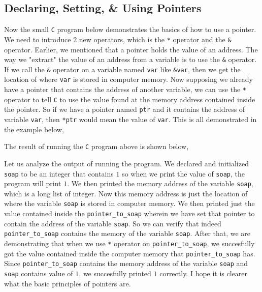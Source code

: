 \documentclass[a4paper, 12pt]{report}
\begin{document}
\begin{center}
\subsection{Declaring, Setting, \& Using Pointers}
\begin{comment}
\end{comment}
Now the small \texttt{C} program below demonstrates the basics of how to use a pointer.
We need to introduce $2$ new operators, which is the \texttt{*}  operator and the \texttt{\&} operator.
Earlier, we mentioned that a pointer holds the value of an address. 
The way we "extract" the value of an address from a variable is to use the \texttt{\&} operator.
If we call the \texttt{\&} operator on a variable named \texttt{var}  like \texttt{\&var}, then we get the location of where \texttt{var} is stored in computer memory.
Now supposing we already have a pointer that contains the address of another variable, we can use the \texttt{*} operator to tell \texttt{C} to use the value found at the memory address contained inside the pointer.
So if we have a pointer named \texttt{ptr} and it contains the address of variable \texttt{var}, then \texttt{*ptr} would mean the value of \texttt{var}.
This is all demonstrated in the example below,

The result of running the \texttt{C} program above is shown below,

Let us analyze the output of running the program.
We declared and initialized \texttt{soap} to be an integer that contains $1$ so when we print the value of \texttt{soap}, the program will print $1$.
We then printed the memory address of the variable \texttt{soap}, which is a long list of integer.
Now this memory address is just the location of where the variable \texttt{soap} is stored in computer memory.
We then printed just the value contained inside the \texttt{pointer\_to\_soap} wherein we have set that pointer to contain the address of the variable \texttt{soap}.
So we can verify that indeed \texttt{pointer\_to\_soap} contains the memory of the variable \texttt{soap}.
After that, we are demonstrating that when we use \texttt{*} operator on \texttt{pointer\_to\_soap}, we succesfully got the value contained inside the computer memory that \texttt{pointer\_to\_soap} has.
Since \texttt{pointer\_to\_soap} contains the memory address of the variable \texttt{soap} and \texttt{soap} contains value of $1$, we succesfully printed $1$ correctly.
I hope it is clearer what the basic principles of pointers are.


\end{center}
\end{document}
